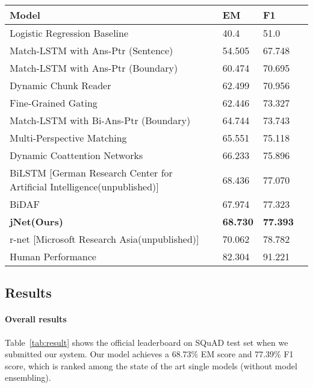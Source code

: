 \documentclass{article}
\begin{document}
\begin{table*}[t]
	\renewcommand{\arraystretch}{1.3}
\centering
	\begin{tabular}{llll}
		\toprule
		Model    &  EM  &  F1  \\
		\midrule
        Logistic Regression Baseline ~\citep{rajpurkar2016squad} &  40.4  & 51.0 \\
		\midrule
        Match-LSTM with Ans-Ptr (Sentence)~\citep{wang2016machine}  & 54.505 & 67.748 \\
        Match-LSTM with Ans-Ptr (Boundary)~\citep{wang2016machine}  & 60.474 & 70.695 \\
        Dynamic Chunk Reader~\citep{yu2016end} & 62.499 & 70.956 \\
        Fine-Grained Gating~\citep{yang2016words}  & 62.446 & 73.327 \\
        Match-LSTM with Bi-Ans-Ptr (Boundary)~\citep{wang2016machine}  & 64.744 & 73.743 \\
        Multi-Perspective Matching~\citep{wang2016multi} & 65.551 & 75.118 \\ 
        Dynamic Coattention Networks~\citep{xiong2016dynamic}  & 66.233 & 75.896 \\
        BiLSTM [German Research Center for Artificial Intelligence(unpublished)]  & 68.436 & 77.070 \\
        BiDAF~\citep{seo2016bidirectional} & 67.974 & 77.323 \\
        \textbf{jNet(Ours)} & \textbf{68.730} & \textbf{77.393} \\ 
		r-net [Microsoft Research Asia(unpublished)] &  70.062  & 78.782 \\
		\midrule
        Human Performance~\citep{rajpurkar2016squad} &  82.304  & 91.221 \\
		\bottomrule
	\end{tabular}
	\caption{The official leaderboard of single models on SQuAD test set as we submitted our systems (January 20, 2017).}
    \label{tab:result}
\end{table*}


\subsection{Results}



\paragraph{Overall results}
Table~\ref{tab:result} shows the official leaderboard on SQuAD test set when we submitted our system. Our model achieves a 68.73\% EM score and 77.39\% F1 score, which is ranked among the state of the art single models (without model ensembling).  
\end{document}
